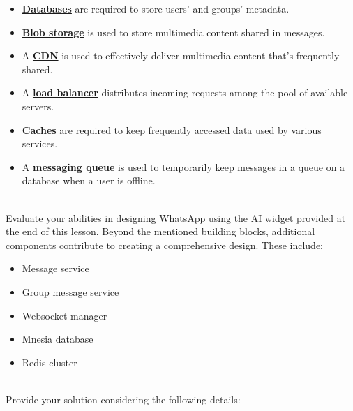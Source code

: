 \begin{itemize}
\item
\protect{}\label{6TQiVBhfLPzx2Syh2nEJO}
\href{https://www.educative.io/courses/grokking-the-system-design-interview/introduction-to-databases}{\textbf{Databases}} are required to store users' and groups' metadata.
\item
\protect{}\label{_wW10-eYyQSGfR7N1xBF-}
\href{https://www.educative.io/courses/grokking-the-system-design-interview/system-design-a-blob-store}{\textbf{Blob storage}} is used to store multimedia content shared in messages.
\item
\protect{}\label{u5pceTVZwRfNA-Hd9f0OW}
A \href{https://www.educative.io/courses/grokking-the-system-design-interview/system-design-the-content-delivery-network-cdn}{\textbf{CDN}} is used to effectively deliver multimedia content that's frequently shared.
\item
\protect{}\label{DTyQNIWMEoEW78sIsG7im}
A \href{https://www.educative.io/courses/grokking-the-system-design-interview/introduction-to-load-balancers}{\textbf{load balancer}} distributes incoming requests among the pool of available servers.
\item
\protect{}\label{Byjp-Q9lEnt4MLTOMGGZ7}
\href{https://www.educative.io/courses/grokking-the-system-design-interview/system-design-the-distributed-cache}{\textbf{Caches}} are required to keep frequently accessed data used by various services.
\item
\protect{}\label{9-ZfTEkh46sHvET6wMpXJ}
A \href{https://www.educative.io/courses/grokking-the-system-design-interview/system-design-the-distributed-messaging-queue}{\textbf{messaging queue}} is used to temporarily keep messages in a queue on a database when a user is offline.
\end{itemize}
\\
Evaluate your abilities in designing WhatsApp using the AI widget provided at the end of this lesson. Beyond the mentioned building blocks, additional components contribute to creating a comprehensive design. These include:

\begin{itemize}
\item
Message service
\item
Group message service
\item
Websocket manager
\item
Mnesia database
\item
Redis cluster
\end{itemize}
\\
Provide your solution considering the following details:

